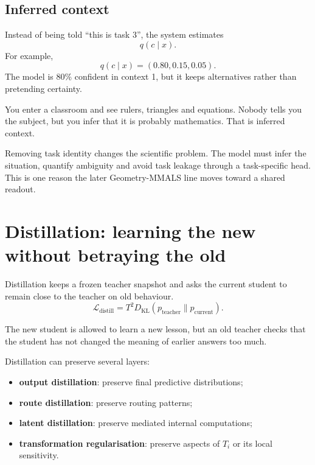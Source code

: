 \documentclass[11pt,a4paper]{article}
\begin{document}
\subsection{Inferred context}

Instead of being told ``this is task 3'', the system estimates
\[
q(c\mid x).
\]
For example,
\[
q(c\mid x)=(0.80,0.15,0.05).
\]
The model is 80\% confident in context 1, but it keeps alternatives rather than pretending certainty.

\begin{twelvebox}
You enter a classroom and see rulers, triangles and equations. Nobody tells you the subject, but you infer that it is probably mathematics. That is inferred context.
\end{twelvebox}

\begin{researchbox}
Removing task identity changes the scientific problem. The model must infer the situation, quantify ambiguity and avoid task leakage through a task-specific head. This is one reason the later Geometry-MMALS line moves toward a shared readout.
\end{researchbox}

\newpage
\section{Distillation: learning the new without betraying the old}

Distillation keeps a frozen teacher snapshot and asks the current student to remain close to the teacher on old behaviour.
\[
\mathcal{L}_{\text{distill}}=T^2D_{\mathrm{KL}}\!\left(p_{\text{teacher}}\parallel p_{\text{current}}\right).
\]

\begin{twelvebox}
The new student is allowed to learn a new lesson, but an old teacher checks that the student has not changed the meaning of earlier answers too much.
\end{twelvebox}

Distillation can preserve several layers:
\begin{itemize}[leftmargin=1.4em]
\item \textbf{output distillation}: preserve final predictive distributions;
\item \textbf{route distillation}: preserve routing patterns;
\item \textbf{latent distillation}: preserve mediated internal computations;
\item \textbf{transformation regularisation}: preserve aspects of $T_i$ or its local sensitivity.
\end{itemize}
\end{document}
